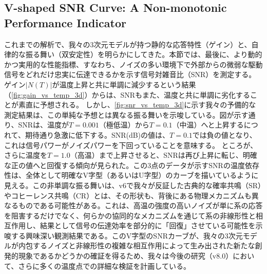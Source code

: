 \documentclass[a4paper,11pt,ja=standard,lualatex]{bxjsarticle}
\newcommand{\figref}[1]{\cref{#1}}
\begin{document}
\subsection{V-shaped SNR Curve: A Non-monotonic Performance Indicator}
\label{subsec:snr}
これまでの解析で、我々の3次元モデルが持つ静的な応答特性（ゲイン）と、自律的な振る舞い（\mbox{双安定}性）を明らかにしてきた。本節では、最後に、より動的かつ実用的な性能指標、すなわち、ノイズの多い環境下で外部からの微弱な駆動信号をどれだけ忠実に伝達できるかを示す信号対雑音比（SNR）を測定する。ゲイン$|N(T)|$が温度上昇と共に単調に減少するという結果（\figref{fig:gain_vs_temp_3d}）からは、SNRもまた、温度と共に単調に劣化することが素直に予想される。
しかし、\figref{fig:snr_vs_temp_3d}に示す我々の予備的な測定結果は、この単純な予想とは異なる振る舞いを示唆している。図が示す通り、SNRは、温度が$T=0.001$（極低温）から$T=0.1$（中温）へと上昇するにつれて、期待通り急激に低下する。SNR(dB)の値は、$T=0.1$では負の値となり、これは信号パワーがノイズパワーを下回っていることを意味する。
ところが、さらに温度を$T=1.0$（高温）まで上昇させると、SNRは再び上昇に転じ、明確な正の値へと回復する傾向が見られた。この3点のデータが示すSNRの温度依存性は、全体として明確なV字型（あるいはU字型）のカーブを描いているように見える。この非単調な振る舞いは、v6で我々が反証した古典的な確率共鳴（SR）やコヒーレンス共鳴（CR）とは、その形状も、背後にある物理メカニズムも異なるものである可能性がある。これは、高温の強度の高いノイズが単に系の応答を阻害するだけでなく、何らかの協同的なメカニズムを通じて系の非線形性と相互作用し、結果として信号の伝達効率を部分的に「回復」させている可能性を示唆する興味深い観測結果である。このV字型のSNRカーブが、我々の3次元モデルが内包するノイズと非線形性の複雑な相互作用によって生み出された新たな\mbox{創発}的現象であるかどうかの確証を得るため、我々は今後の研究（v8.0）において、さらに多くの温度点での詳細な検証を計画している。
\end{document}

